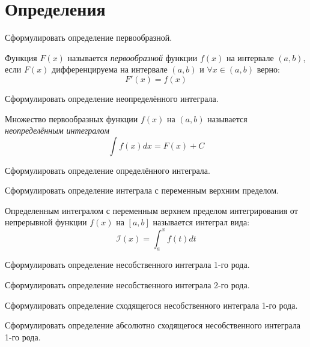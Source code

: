 \section{Определения}

\begin{question}
	Сформулировать определение первообразной.
\end{question}
\begin{answer}
    Функция $F(x)$ называется \textit{первообразной} функции $f(x)$ на интервале $(a, b)$, если $F(x)$ дифференцируема на интервале $(a, b)$ и $\forall x \in (a, b)$ верно: \[
        F'(x) = f(x)
    \]
\end{answer}

\begin{question}
	Сформулировать определение неопределённого интеграла.
\end{question}
\begin{answer}
    Множество первообразных функции $f(x)$ на $(a, b)$ называется \textit{неопределённым интегралом} \[
        \int f(x)dx = F(x) + C
    \]
\end{answer} 

\begin{question}
	Сформулировать определение определённого интеграла.
\end{question}

\begin{question}
	Сформулировать определение интеграла с переменным верхним пределом.
\end{question}
\begin{answer}
  Определенным интегралом с переменным верхнем пределом интегрирования от непрерывной функции $f(x)$ на $[a, b]$ называется интеграл вида: \[
  \mathcal{I}(x) = \int_a^x f(t) dt
  \] 
\end{answer} 

\begin{question}
	Сформулировать определение несобственного интеграла 1-го рода.
\end{question}

\begin{question}
	Сформулировать определение несобственного интеграла 2-го рода.
\end{question}

\begin{question}
	Сформулировать определение сходящегося несобственного интеграла 1-го рода.
\end{question}

\begin{question}
	Сформулировать определение абсолютно сходящегося несобственного интеграла 1-го рода.
\end{question}

